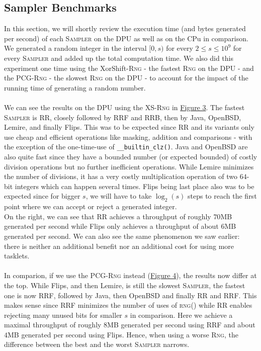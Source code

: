 \documentclass[a4paper]{scrartcl}
\begin{document}
\subsection{Sampler Benchmarks}
In this section, we will shortly review the execution time (and bytes generated per second) of each \textsc{Sampler} on the DPU as well as on the CPu in comparison.
We generated a random integer in the interval $[0,s)$ for every $2 \leq s \leq 10^9$ for every \textsc{Sampler} and added up the total computation time.
We also did this experiment one time using the XorShift-\textsc{Rng} - the fastest \textsc{Rng} on the DPU - and the PCG-\textsc{Rng} - the slowest \textsc{Rng} on the DPU - to account for the impact of the running time of generating a random number.
\\
\\
We can see the results on the DPU using the XS-\textsc{Rng} in \hyperref[fig:3]{Figure 3}.
The fastest \textsc{Sampler} is RR, closely followed by RRF and RRB, then by Java, OpenBSD, Lemire, and finally Flips.
This was to be expected since RR and its variants only use cheap and efficient operations like masking, addition and comparisons - with the exception of the one-time-use of \texttt{\_\_builtin\_clz()}.
Java and OpenBSD are also quite fast since they have a bounded number (or expected bounded) of costly division operations but no further inefficient operations.
While Lemire minimizes the number of divisions, it has a very costly multiplication operation of two $64$-bit integers which can happen several times.
Flips being last place also was to be expected since for bigger $s$, we will have to take $\log_2(s)$ steps to reach the first point where we can accept or reject a generated integer.
\\
On the right, we can see that RR achieves a throughput of roughly $70$MB generated per second while Flips only achieves a throughput of about $6$MB generated per second.
We can also see the same phenomenon we saw earlier: there is neither an additional benefit nor an additional cost for using more tasklets.
\\
\\
In comparion, if we use the PCG-\textsc{Rng} instead (\hyperref[fig:4]{Figure 4}), the results now differ at the top.
While Flips, and then Lemire, is still the slowest \textsc{Sampler}, the fastest one is now RRF, followed by Java, then OpenBSD and finally RR and RRF.
This makes sense since RRF minimizes the number of uses of \textsc{rng()} while RR enables rejecting many unused bits for smaller $s$ in comparison.
Here we achieve a maximal throughput of roughly $8$MB generated per second using RRF and about $4$MB generated per second using Flips.
Hence, when using a worse \textsc{Rng}, the difference between the best and the worst \textsc{Sampler} narrows.
\\
\end{document}
